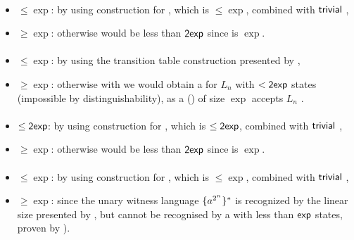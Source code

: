 \paragraph{\OLA{}\tto\TNFA}
\begin{itemize}
	\item $\le\exp$: by using construction for \hyperref[cost:1LAto1NFA]{\OLA{}\tto\ONFA}, which is $\le\exp$, combined with $\mathsf{trivial}$ \ONFA{}\tto\TNFA,
	\item $\ge\exp$: otherwise \hyperref[cost:1LAto1DFA]{\OLA{}\tto\ODFA} would be less than $\mathsf{2exp}$ since \TNFA{}\tto\ODFA is $\exp$.
\end{itemize}
\paragraph{\ODLA{}\tto\ODFA}\label{cost:1DLAto1DFA}
\begin{itemize}
	\item $\le\exp$: by using the transition table construction presented by ,
	\item $\ge\exp$: otherwise with \hyperref[cost:1DLAto1DFA]{\ODLA{}\tto\ODFA} we would obtain a \ODFA for $L_n$ with $<\mathsf{2exp}$ states (impossible by distinguishability), as a \ODLA (\TDFA) of size $\exp$ accepts $L_n$ \cite{PigPis14}.
\end{itemize}
\paragraph{\OLA{}\tto\ODLA}
\begin{itemize}
	\item $\le\mathsf{2exp}$: by using construction for \hyperref[cost:1LAto1DFA]{\OLA{}\tto\ODFA}, which is $\le\mathsf{2exp}$, combined with $\mathsf{trivial}$ \ODFA{}\tto\ODLA,
	\item $\ge\exp$: otherwise \hyperref[cost:1LAto1DFA]{\OLA{}\tto\ODFA} would be less than $\mathsf{2exp}$ since \ODLA{}\tto\ODFA is $\exp$.
\end{itemize}
\paragraph{\ODLA{}\tto\TNFA}\label{cost:1DLAto2NFA}
\begin{itemize}
	\item $\le\exp$: by using construction for \hyperref[cost:1DLAto1DFA]{\ODLA{}\tto\ODFA}, which is $\le\exp$, combined with $\mathsf{trivial}$ \ODFA{}\tto\TNFA,
	\item $\ge\exp$: since the unary witness language $\{a^{2^n}\}^*$ is recognized by the linear size \ODLA presented by , but cannot be recognised by a \TNFA with less than $\mathsf{exp}$ states, proven by ).
\end{itemize}
